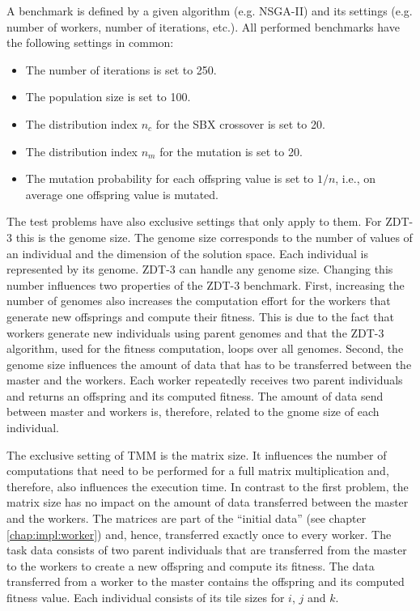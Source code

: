 A benchmark is defined by a given algorithm (e.g. NSGA-II) and its settings (e.g. number of workers, number of iterations, etc.). All performed benchmarks have the following settings in common:
\begin{itemize}
  \item The number of iterations is set to 250.
  \item The population size is set to 100.
  \item The distribution index $n_c$ for the SBX crossover is set to 20.
  \item The distribution index $n_m$ for the mutation is set to 20.
  \item The mutation probability for each offspring value is set to $1/n$, i.e., on average one offspring value is mutated.
\end{itemize}

The test problems have also exclusive settings that only apply to them. For ZDT-3 this is the genome size. The genome size corresponds to the number of values of an individual and the dimension of the solution space. Each individual is represented by its genome. ZDT-3 can handle any genome size. Changing this number influences two properties of the ZDT-3 benchmark. First, increasing the number of genomes also increases the computation effort for the workers that generate new offsprings and compute their fitness. This is due to the fact that workers generate new individuals using parent genomes and that the ZDT-3 algorithm, used for the fitness computation, loops over all genomes. Second, the genome size influences the amount of data that has to be transferred between the master and the workers. Each worker repeatedly receives two parent individuals and returns an offspring and its computed fitness. The amount of data send between master and workers is, therefore, related to the gnome size of each individual.

The exclusive setting of TMM is the matrix size. It influences the number of computations that need to be performed for a full matrix multiplication and, therefore, also influences the execution time. In contrast to the first problem, the matrix size has no impact on the amount of data transferred between the master and the workers. The matrices are part of the ``initial data'' (see chapter \ref{chap:impl:worker}) and, hence, transferred exactly once to every worker. The task data consists of two parent individuals that are transferred from the master to the workers to create a new offspring and compute its fitness. The data transferred from a worker to the master contains the offspring and its computed fitness value. Each individual consists of its tile sizes for $i$, $j$ and $k$.


